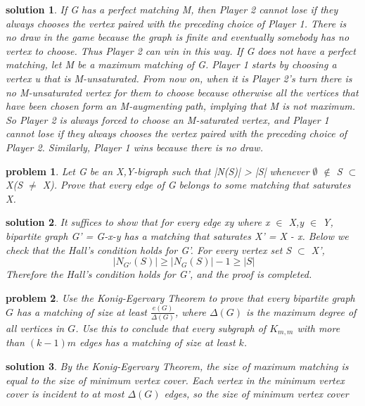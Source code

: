 \documentclass[twocolumn]{article}
\newtheorem{problem}{problem}
\newtheorem{solution}{solution}
\begin{document}
\begin{CJK*}{UTF8}{bkai}
\begin{solution}
 If G has a perfect matching M, then Player 2 cannot lose if they always chooses the vertex paired
 with the preceding choice of Player 1. There is no draw in the game because the graph is finite and
 eventually somebody has no vertex to choose. Thus Player 2 can win in this way.
 If G does not have a perfect matching, let M be a maximum matching of G. Player 1 starts by
 choosing a vertex u that is M-unsaturated. From now on, when it is Player 2's turn there is no
 M-unsaturated vertex for them to choose because otherwise all the vertices that have been chosen
 form an M-augmenting path, implying that M is not maximum. So Player 2 is always forced to
 choose an M-saturated vertex, and Player 1 cannot lose if they always chooses the vertex paired
 with the preceding choice of Player 2. Similarly, Player 1 wins because there is no draw.
\end{solution}

\begin{problem}
     Let G be an X,Y-bigraph such that |N(S)| > |S| whenever $\emptyset$ $\notin$ S $\subset $ X(S $\neq$ X). Prove that every edge of
 G belongs to some matching that saturates X.
\end{problem}

\begin{solution}
 It suffices to show that for every edge xy where x $\in$ X,y $\in$ Y, bipartite graph G' = G-x-y has
 a matching that saturates X' = X - {x}. Below we check that the Hall's condition holds for G'.
 For every vertex set S $\subset$ X',
 \[
 \   |N_{G'}(S)| \geq |N_{G}(S)| -1 \geq |S|
 \]
 Therefore the Hall's condition holds for G', and the proof is completed.
\end{solution}


\begin{problem}
Use the Konig-Egervary Theorem to prove that every bipartite graph \( G \) has a matching of size at least \( \frac{e(G)}{\Delta(G)} \), where \( \Delta(G) \) is the maximum degree of all vertices in \( G \). Use this to conclude that every subgraph of \( K_{m,m} \) with more than \( (k - 1)m \) edges has a matching of size at least \( k \).
\end{problem}

\begin{solution}
By the Konig-Egervary Theorem, the size of maximum matching is equal to the size of minimum vertex cover. Each vertex in the minimum vertex cover is incident to at most \( \Delta(G) \) edges, so the size of minimum vertex cover


\end{solution}
\end{CJK*}
\end{document}
